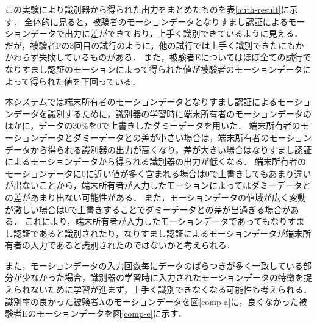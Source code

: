 この実験により識別器から得られた出力をまとめたものを表\ref{auth-result}に示す．
全体的に見ると，被験者のモーションデータとなりすまし認証によるモーションデータで出力に差ができており，上手く識別できているように見える．
だが，被験者Fの3回目の試行のように，他の試行では上手く識別できたにもかかわらず失敗しているものがある．
また，被験者Eについてはほぼ全ての試行でなりすまし認証のモーションによって得られた値が被験者のモーションデータによって得られた値を下回っている．

本システムでは端末所有者のモーションデータとなりすまし認証によるモーションデータを識別するために，識別器の学習時に端末所有者のモーションデータのほかに，データの30\%を0で上書きしたダミーデータを用いた．
端末所有者のモーションデータとダミーデータとの差が小さい場合は，端末所有者のモーションデータから得られる識別器の出力が高くなり，差が大きい場合はなりすまし認証によるモーションデータから得られる識別器の出力が低くなる．
端末所有者のモーションデータに0に近い値が多く含まれる場合は0で上書きしてもあまり違いが出ないことから，端末所有者が入力したモーションによってはダミーデータとの差があまり出ない可能性がある．
また，モーションデータの値域が広く変動が激しい場合は0で上書きすることでダミーデータとの差が出過ぎる場合がある．
これにより，端末所有者が入力したモーションデータであってもなりすまし認証であると識別されたり，なりすまし認証によるモーションデータが端末所有者の入力であると識別されたのではないかと考えられる．

また，モーションデータの入力回数毎にデータのばらつきが多く一致している部分が少なかった場合，識別器の学習時に入力されたモーションデータの特徴を捉えられないために学習が進まず，上手く識別できなくなる可能性も考えられる．
識別率の良かった被験者Aのモーションデータを図\ref{comp-a}に，良くなかった被験者Eのモーションデータを図\ref{comp-e}に示す．

